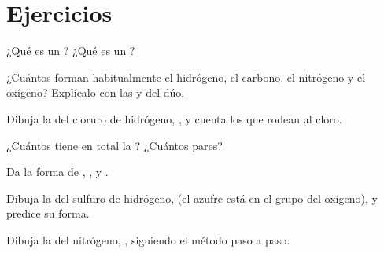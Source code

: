 \section{Ejercicios}

\begin{exercise}[$\star$]\label{exo:g10:lewis-and-shape:1}
¿Qué es un ? ¿Qué es un ?
\end{exercise}

\begin{exercise}[$\star$]\label{exo:g10:lewis-and-shape:2}
¿Cuántos  forman habitualmente el hidrógeno, el
carbono, el nitrógeno y el oxígeno? Explícalo con las 
y del dúo.
\end{exercise}

\begin{exercise}[$\star$]\label{exo:g10:lewis-and-shape:3}
Dibuja la  del cloruro de hidrógeno, , y
cuenta los  que rodean al cloro.
\end{exercise}

\begin{exercise}[$\star$]\label{exo:g10:lewis-and-shape:4}
¿Cuántos  tiene en total la  ?
¿Cuántos pares?
\end{exercise}

\begin{exercise}[$\star$]\label{exo:g10:lewis-and-shape:5}
Da la forma de , ,  y .
\end{exercise}

\begin{exercise}[$\star\star$]\label{exo:g10:lewis-and-shape:6}
Dibuja la  del sulfuro de hidrógeno,  (el
azufre está en el grupo del oxígeno), y predice su forma.
\end{exercise}

\begin{exercise}[$\star\star$]\label{exo:g10:lewis-and-shape:7}
Dibuja la  del nitrógeno, , siguiendo el
método paso a paso.
\end{exercise}

